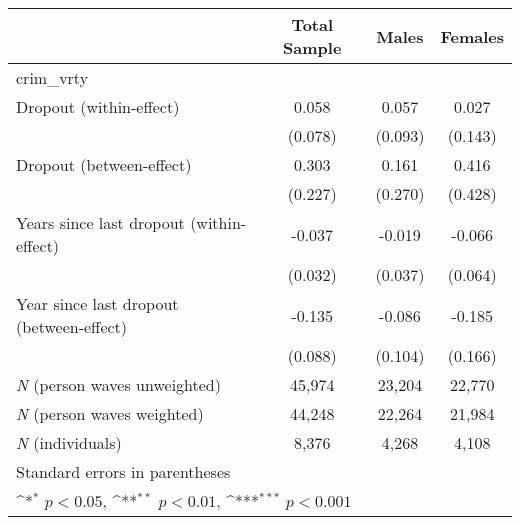 {
\def\sym#1{\ifmmode^{#1}\else\(^{#1}\)\fi}
\begin{tabular}{l*{3}{c}}
\toprule
                    &\multicolumn{1}{c}{Total Sample}&\multicolumn{1}{c}{Males}&\multicolumn{1}{c}{Females}\\
\midrule
crim\_vrty           &                     &                     &                     \\
Dropout (within-effect)&       0.058         &       0.057         &       0.027         \\
                    &     (0.078)         &     (0.093)         &     (0.143)         \\
\addlinespace
Dropout (between-effect)&       0.303         &       0.161         &       0.416         \\
                    &     (0.227)         &     (0.270)         &     (0.428)         \\
\addlinespace
Years since last dropout (within-effect)&      -0.037         &      -0.019         &      -0.066         \\
                    &     (0.032)         &     (0.037)         &     (0.064)         \\
\addlinespace
Year since last dropout (between-effect)&      -0.135         &      -0.086         &      -0.185         \\
                    &     (0.088)         &     (0.104)         &     (0.166)         \\
\midrule
\textit{N} (person waves unweighted)&      45,974         &      23,204         &      22,770         \\
\textit{N} (person waves weighted)&      44,248         &      22,264         &      21,984         \\
\textit{N} (individuals)&       8,376         &       4,268         &       4,108         \\
\bottomrule
\multicolumn{4}{l}{\footnotesize Standard errors in parentheses}\\
\multicolumn{4}{l}{\footnotesize \sym{*} \(p<0.05\), \sym{**} \(p<0.01\), \sym{***} \(p<0.001\)}\\
\end{tabular}
}
